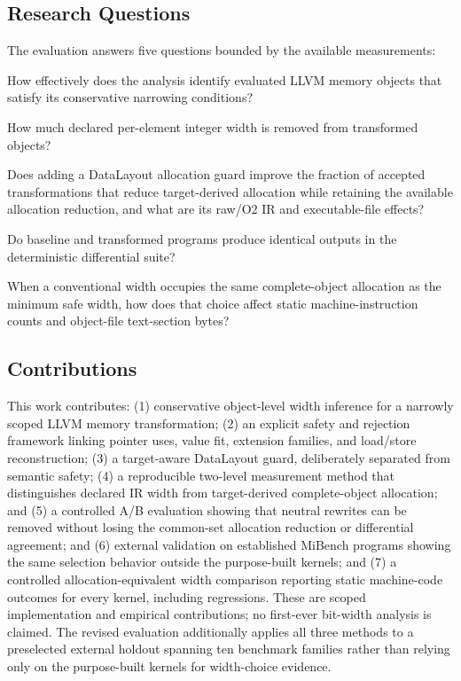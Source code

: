 \documentclass[11pt,twocolumn]{article}
\begin{document}
\subsection{Research Questions}

The evaluation answers five questions bounded by the available measurements:

\begin{description}[style=nextline,leftmargin=0pt]
  \item[RQ1:] How effectively does the analysis identify evaluated LLVM memory
  objects that satisfy its conservative narrowing conditions?
  \item[RQ2:] How much declared per-element integer width is removed from
  transformed objects?
  \item[RQ3:] Does adding a DataLayout allocation guard improve the fraction of
  accepted transformations that reduce target-derived allocation while
  retaining the available allocation reduction, and what are its raw/O2 IR and
  executable-file effects?
  \item[RQ4:] Do baseline and transformed programs produce identical outputs in
  the deterministic differential suite?
  \item[RQ5:] When a conventional width occupies the same complete-object
  allocation as the minimum safe width, how does that choice affect static
  machine-instruction counts and object-file text-section bytes?
\end{description}

\subsection{Contributions}

This work contributes: (1) conservative object-level width inference for a
narrowly scoped LLVM memory transformation; (2) an explicit safety and rejection
framework linking pointer uses, value fit, extension families, and load/store
reconstruction; (3) a target-aware DataLayout guard, deliberately separated
from semantic safety; (4) a reproducible two-level measurement method that
distinguishes declared IR width from target-derived complete-object allocation;
and (5) a controlled A/B evaluation showing that neutral rewrites can be removed
without losing the common-set allocation reduction or differential agreement;
and (6) external validation on established MiBench programs showing the same
selection behavior outside the purpose-built kernels; and (7) a controlled
allocation-equivalent width comparison reporting static machine-code outcomes
for every kernel, including regressions. These are scoped implementation and
empirical contributions; no first-ever bit-width analysis is claimed.
The revised evaluation additionally applies all three methods to a preselected
external holdout spanning ten benchmark families rather than relying only on
the purpose-built kernels for width-choice evidence.
\end{document}
